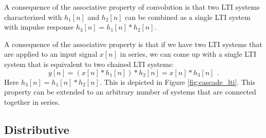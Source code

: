 \begin{marginfigure}
\begin{center}
\end{center}
\caption{A consequence of the associative property of convolution is
  that two LTI systems characterized with $h_1[n]$ and $h_2[n]$ can be
  combined as a single LTI system with impulse response
  $h_3[n]=h_1[n]*h_2[n]$.}
\label{fig:cascade_lti}
\end{marginfigure}

A consequence of the associative property is that if we have two LTI
systems that are applied to an input signal $x[n]$ in series, we can
come up with a single LTI system that is equivalent to two  chained LTI systems:
\begin{equation}
  y[n] = (x[n]*h_1[n])*h_2[n] = x[n]*h_3[n]\,\,.
\end{equation}
Here $h_3[n]=h_1[n]*h_2[n]$. This is depicted in Figure
\ref{fig:cascade_lti}. This property can be extended to an arbitrary
number of systems that are connected together in series.

\subsection{Distributive}

